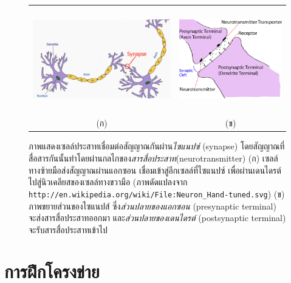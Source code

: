 %
\begin{figure}
\begin{center}
\begin{tabular}{cc}
\includegraphics[height=1.8in]{04ANN/Synapse.png}
&
\includegraphics[height=1.8in]{04ANN/chemicalSynapseCol.png}
\\
(ก) & (ข) \\
\end{tabular} 

\end{center}
\caption{ภาพแสดงเซลล์ประสาทเชื่อมต่อสัญญาณกันผ่าน\textit{ไซแนปซ์} (synapse)
โดยสัญญาณที่สื่อสารกันนั้นทำโดยผ่านกลไกของ\textit{สารสื่อประสาท}(neurotransmitter)
(ก) เซลล์ทางซ้ายมือส่งสัญญาณผ่านแอกซอน เชื่อมเข้าสู่อีกเซลล์ที่ไซแนปซ์ เพื่อผ่านเดนไดรต์ไปสู่นิวเคลียสของเซลล์ทางขวามือ
{\footnotesize 
(ภาพดัดแปลงจาก \texttt{http://en.wikipedia.org/wiki/File:Neuron\_Hand-tuned.svg})
}
(ข) ภาพขยายส่วนของไซแนปส์ ซึ่ง\textit{ส่วนปลายของแอกซอน} (presynaptic terminal) จะส่งสารสื่อประสาทออกมา และ\textit{ส่วนปลายของเดนไดรต์} (postsynaptic terminal) จะรับสารสื่อประสาทเข้าไป
}
\label{fig: ANN synapse}
\end{figure}
%





\section{การฝึกโครงข่าย}
\label{sec: ANN training}

